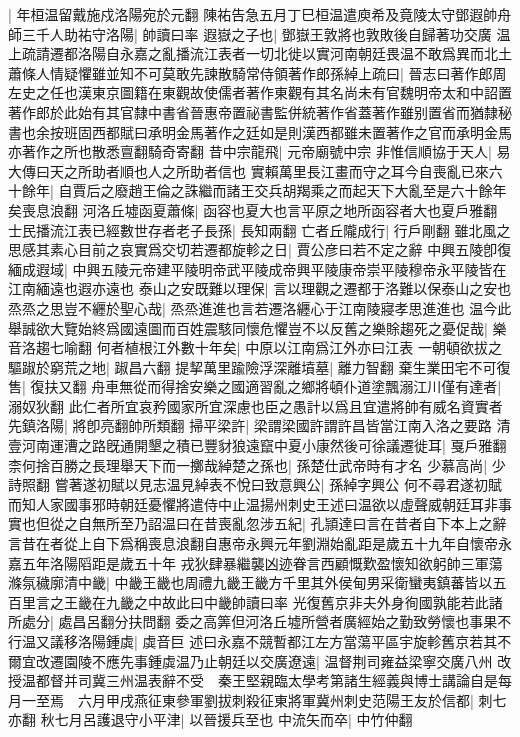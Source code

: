 |{
	年桓温留戴施戍洛陽宛於元翻}
陳祐告急五月丁巳桓温遣庾希及竟陵太守鄧遐帥舟師三千人助祐守洛陽|{
	帥讀曰率}
遐嶽之子也|{
	鄧嶽王敦將也敦敗後自歸著功交廣}
温上疏請遷都洛陽自永嘉之亂播流江表者一切北徙以實河南朝廷畏温不敢爲異而北土蕭條人情疑懼雖並知不可莫敢先諫散騎常侍領著作郎孫綽上疏曰|{
	晉志曰著作郎周左史之任也漢東京圖籍在東觀故使儒者著作東觀有其名尚未有官魏明帝太和中詔置著作郎於此始有其官隸中書省晉惠帝置祕書監併統著作省蓋著作雖别置省而猶隸秘書也余按班固西都賦曰承明金馬著作之廷如是則漢西都雖未置著作之官而承明金馬亦著作之所也散悉亶翻騎奇寄翻}
昔中宗龍飛|{
	元帝廟號中宗}
非惟信順協于天人|{
	易大傳曰天之所助者順也人之所助者信也}
實賴萬里長江畫而守之耳今自喪亂已來六十餘年|{
	自賈后之廢趙王倫之誅繼而諸王交兵胡羯乘之而起天下大亂至是六十餘年矣喪息浪翻}
河洛丘墟函夏蕭條|{
	函容也夏大也言平原之地所函容者大也夏戶雅翻}
士民播流江表已經數世存者老子長孫|{
	長知兩翻}
亡者丘隴成行|{
	行戶剛翻}
雖北風之思感其素心目前之哀實爲交切若遷都旋軫之日|{
	賈公彦曰若不定之辭}
中興五陵卽復緬成遐域|{
	中興五陵元帝建平陵明帝武平陵成帝興平陵康帝崇平陵穆帝永平陵皆在江南緬遠也遐亦遠也}
泰山之安既難以理保|{
	言以理觀之遷都于洛難以保泰山之安也}
烝烝之思豈不纒於聖心哉|{
	烝烝進進也言若遷洛纒心于江南陵寢孝思進進也}
温今此舉誠欲大覽始終爲國遠圖而百姓震駭同懷危懼豈不以反舊之樂賖趨死之憂促哉|{
	樂音洛趨七喻翻}
何者植根江外數十年矣|{
	中原以江南爲江外亦曰江表}
一朝頓欲拔之驅踧於窮荒之地|{
	踧昌六翻}
提挈萬里踰險浮深離墳墓|{
	離力智翻}
棄生業田宅不可復售|{
	復扶又翻}
舟車無從而得捨安樂之國適習亂之鄉將頓仆道塗飄溺江川僅有達者|{
	溺奴狄翻}
此仁者所宜哀矜國家所宜深慮也臣之愚計以爲且宜遣將帥有威名資實者先鎮洛陽|{
	將卽亮翻帥所類翻}
掃平梁許|{
	梁謂梁國許謂許昌皆當江南入洛之要路}
清壹河南運漕之路旣通開墾之積已豐豺狼遠竄中夏小康然後可徐議遷徙耳|{
	戛戶雅翻}
柰何捨百勝之長理舉天下而一擲哉綽楚之孫也|{
	孫楚仕武帝時有才名}
少慕高尚|{
	少詩照翻}
嘗著遂初賦以見志温見綽表不悅曰致意興公|{
	孫綽字興公}
何不尋君遂初賦而知人家國事邪時朝廷憂懼將遣侍中止温揚州刺史王述曰温欲以虛聲威朝廷耳非事實也但從之自無所至乃詔温曰在昔喪亂忽涉五紀|{
	孔頴達曰言在昔者自下本上之辭言昔在者從上自下爲稱喪息浪翻自惠帝永興元年劉淵始亂距是歲五十九年自懷帝永嘉五年洛陽䧟距是歲五十年}
戎狄肆暴繼襲凶迹眷言西顧慨歎盈懷知欲躬帥三軍蕩滌氛穢廓清中畿|{
	中畿王畿也周禮九畿王畿方千里其外侯甸男采衛蠻夷鎮蕃皆以五百里言之王畿在九畿之中故此曰中畿帥讀曰率}
光復舊京非夫外身徇國孰能若此諸所處分|{
	處昌呂翻分扶問翻}
委之高筭但河洛丘墟所營者廣經始之勤致勞懷也事果不行温又議移洛陽鍾虡|{
	虡音巨}
述曰永嘉不競暫都江左方當蕩平區宇旋軫舊京若其不爾宜改遷園陵不應先事鍾虡温乃止朝廷以交廣遼遠|{
	温督荆司雍益梁寧交廣八州}
改授温都督并司冀三州温表辭不受　秦王堅親臨太學考第諸生經義與博士講論自是每月一至焉　六月甲戌燕征東參軍劉拔刺殺征東將軍冀州刺史范陽王友於信都|{
	刺七亦翻}
秋七月呂護退守小平津|{
	以晉援兵至也}
中流矢而卒|{
	中竹仲翻}


